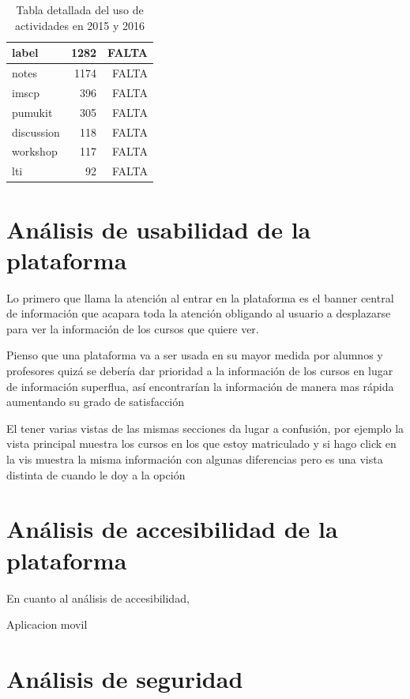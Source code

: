 \begin{table}[H]
\begin{tabular}{|l|r|r|}
label           & 1282          & FALTA         \\ \hline
notes           & 1174          & FALTA         \\ \hline
imscp           & 396           & FALTA         \\ \hline
pumukit         & 305           & FALTA         \\ \hline
discussion      & 118           & FALTA         \\ \hline
workshop        & 117           & FALTA         \\ \hline
lti             & 92            & FALTA         \\ \hline
\end{tabular}
\caption{Tabla detallada del uso de actividades en 2015 y 2016}
\label{table:usoactividades_2015}
\end{table}




\section{Análisis de usabilidad de la plataforma}


Lo primero que llama la atención al entrar en la plataforma es el banner central de información que acapara toda la atención obligando al usuario a desplazarse para ver la información de los cursos que quiere ver.

Pienso que una plataforma va a ser usada en su mayor medida por alumnos y profesores quizá se debería dar prioridad a la información de los cursos en lugar de información superflua, así encontrarían la información de manera mas rápida aumentando su grado de satisfacción

El tener varias vistas de las mismas secciones da lugar a confusión, por ejemplo la vista principal muestra los cursos en los que estoy matriculado y si hago click en la vis muestra la misma información con algunas diferencias pero es una vista distinta de cuando le doy a la opción 

\section{Análisis de accesibilidad de la plataforma}

En cuanto al análisis de accesibilidad, 



Aplicacion movil


\section{Análisis de seguridad}



